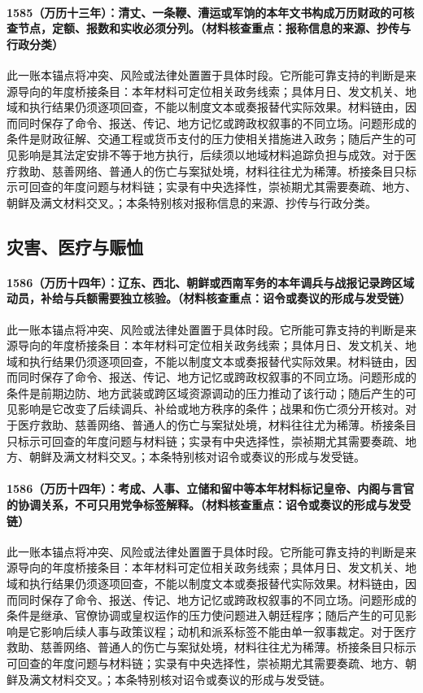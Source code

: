 \paragraph{1585（万历十三年）：清丈、一条鞭、漕运或军饷的本年文书构成万历财政的可核查节点，定额、报数和实收必须分列。（材料核查重点：报称信息的来源、抄传与行政分类）} 此一账本锚点将冲突、风险或法律处置置于具体时段。它所能可靠支持的判断是来源导向的年度桥接条目：本年材料可定位相关政务线索；具体月日、发文机关、地域和执行结果仍须逐项回查，不能以制度文本或奏报替代实际效果。材料链由，因而同时保存了命令、报送、传记、地方记忆或跨政权叙事的不同立场。问题形成的条件是财政征解、交通工程或货币支付的压力使相关措施进入政务；随后产生的可见影响是其法定安排不等于地方执行，后续须以地域材料追踪负担与成效。对于医疗救助、慈善网络、普通人的伤亡与案狱处境，材料往往尤为稀薄。桥接条目只标示可回查的年度问题与材料链；实录有中央选择性，崇祯期尤其需要奏疏、地方、朝鲜及满文材料交叉。；本条特别核对报称信息的来源、抄传与行政分类。

\subsection{灾害、医疗与赈恤}

\paragraph{1586（万历十四年）：辽东、西北、朝鲜或西南军务的本年调兵与战报记录跨区域动员，补给与兵额需要独立核验。（材料核查重点：诏令或奏议的形成与发受链）} 此一账本锚点将冲突、风险或法律处置置于具体时段。它所能可靠支持的判断是来源导向的年度桥接条目：本年材料可定位相关政务线索；具体月日、发文机关、地域和执行结果仍须逐项回查，不能以制度文本或奏报替代实际效果。材料链由，因而同时保存了命令、报送、传记、地方记忆或跨政权叙事的不同立场。问题形成的条件是前期边防、地方武装或跨区域资源调动的压力推动了该行动；随后产生的可见影响是它改变了后续调兵、补给或地方秩序的条件；战果和伤亡须分开核对。对于医疗救助、慈善网络、普通人的伤亡与案狱处境，材料往往尤为稀薄。桥接条目只标示可回查的年度问题与材料链；实录有中央选择性，崇祯期尤其需要奏疏、地方、朝鲜及满文材料交叉。；本条特别核对诏令或奏议的形成与发受链。

\paragraph{1586（万历十四年）：考成、人事、立储和留中等本年材料标记皇帝、内阁与言官的协调关系，不可只用党争标签解释。（材料核查重点：诏令或奏议的形成与发受链）} 此一账本锚点将冲突、风险或法律处置置于具体时段。它所能可靠支持的判断是来源导向的年度桥接条目：本年材料可定位相关政务线索；具体月日、发文机关、地域和执行结果仍须逐项回查，不能以制度文本或奏报替代实际效果。材料链由，因而同时保存了命令、报送、传记、地方记忆或跨政权叙事的不同立场。问题形成的条件是继承、官僚协调或皇权运作的压力使问题进入朝廷程序；随后产生的可见影响是它影响后续人事与政策议程；动机和派系标签不能由单一叙事裁定。对于医疗救助、慈善网络、普通人的伤亡与案狱处境，材料往往尤为稀薄。桥接条目只标示可回查的年度问题与材料链；实录有中央选择性，崇祯期尤其需要奏疏、地方、朝鲜及满文材料交叉。；本条特别核对诏令或奏议的形成与发受链。

